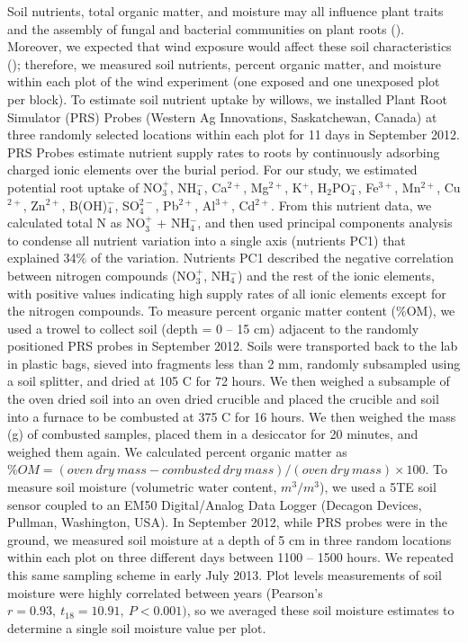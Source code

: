\documentclass[11pt]{article}
\begin{document}
Soil nutrients, total organic matter, and moisture may all influence
plant traits and the assembly of fungal and bacterial communities on
plant roots (\citealt{Erlandson_2015}). Moreover, we expected that wind exposure
would affect these soil characteristics (\citealt{LORTIE_2007}); therefore, we
measured soil nutrients, percent organic matter, and moisture within
each plot of the wind experiment (one exposed and one unexposed plot per
block). To estimate soil nutrient uptake by willows, we installed Plant
Root Simulator (PRS) Probes (Western Ag Innovations, Saskatchewan,
Canada) at three randomly selected locations within each plot for 11
days in September 2012. PRS Probes estimate nutrient supply rates to
roots by continuously adsorbing charged ionic elements over the burial
period. For our study, we estimated potential root uptake of NO$_3^+$, NH$_4^-$,
Ca$^{2+}$, Mg$^{2+}$, K$^+$, H$_2$PO$_4^-$, Fe$^{3+}$, Mn$^{2+}$, Cu$^{2+}$, Zn$^{2+}$, B(OH)$_4^-$, SO$_4^{2-}$, Pb$^{2+}$, Al$^{3+}$, Cd$^{2+}$. From this nutrient
data, we calculated total N as NO$_3^+$ + NH$_4^-$, and then used principal
components analysis to condense all nutrient variation into a single axis
(nutrients PC1) that explained 34\% of the variation. Nutrients PC1
described the negative correlation between nitrogen compounds (NO$_3^+$, NH$_4^-$) and the rest of the ionic elements, with positive values
indicating high supply rates of all ionic elements except for the
nitrogen compounds. To measure percent organic matter content (\%OM), we
used a trowel to collect soil (depth = 0 -- 15 cm) adjacent to the
randomly positioned PRS probes in September 2012. Soils were transported
back to the lab in plastic bags, sieved into fragments less than 2 mm,
randomly subsampled using a soil splitter, and dried at 105 \degree C
for 72 hours. We then weighed a subsample of the oven dried soil into an
oven dried crucible and placed the crucible and soil into a furnace to
be combusted at 375 \degree C for 16 hours. We then weighed the mass (g) of combusted samples, placed them in a desiccator for 20 minutes, and
weighed them again. We calculated percent organic matter
as $\%OM=(oven\ dry\ mass - combusted\ dry\ mass)/(oven\ dry\ mass)\times100$. To measure soil moisture (volumetric water content,
$m^3/m^3$), we used a 5TE soil sensor coupled to an EM50
Digital/Analog Data Logger (Decagon Devices, Pullman, Washington, USA).
In September 2012, while PRS probes were in the ground, we measured soil
moisture at a depth of 5 cm in three random locations within each plot
on three different days between 1100 -- 1500 hours. We repeated this
same sampling scheme in early July 2013. Plot levels measurements of
soil moisture were highly correlated between years (Pearson's
\(r=0.93,\ t_{18}=10.91,\ P<0.001)\), so we averaged these soil moisture estimates to
determine a single soil moisture value per plot.
\end{document}
